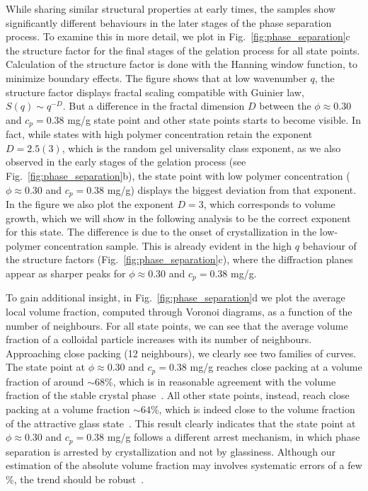 \documentclass[preprint,amsmath,amssymb,superscriptaddress]{revtex4}
\begin{document}
While sharing similar structural properties at early times, the samples show significantly different behaviours in the later stages of the phase separation process.
To examine this in more detail, we plot in Fig.~\ref{fig:phase_separation}c the structure factor for the final stages of the gelation process for all state points.
Calculation of the structure factor is done with the Hanning window function, to minimize boundary effects.
The figure shows that at low wavenumber $q$, the structure factor displays fractal scaling compatible with Guinier law, $S(q)\sim q^{-D}$.
But a difference in the fractal dimension $D$ between the $\phi\approx 0.30$ and $c_p=0.38$ mg/g state point and other state points starts to become visible. In fact, while states
with high polymer concentration retain the exponent $D=2.5(3)$, 
which is the random gel universality class exponent, as we also observed in the early stages of the gelation process (see Fig.~\ref{fig:phase_separation}b),
the state point with low polymer concentration ($\phi\approx 0.30$ and $c_p=0.38$ mg/g) displays the biggest deviation from that exponent. In the figure we also
plot the exponent $D=3$, which corresponds to volume growth, which we will show in the following analysis to be the correct exponent for this state. 
The difference is due to the onset of crystallization in the low-polymer concentration sample. This is already evident in the high $q$ behaviour of
the structure factors (Fig.~\ref{fig:phase_separation}c), where the diffraction planes appear as sharper peaks for $\phi\approx 0.30$ and $c_p=0.38$ mg/g.

To gain additional insight, in Fig.~\ref{fig:phase_separation}d we plot the average local volume fraction, computed
through Voronoi diagrams, as a function of the number of neighbours. For all state points, we can see that the average volume fraction of a colloidal
particle increases with its number of neighbours. Approaching close packing (12 neighbours), we clearly see two families of curves. The state point
at $\phi\approx 0.30$ and $c_p=0.38$ mg/g reaches close packing at a volume fraction of around $\sim 68\%$, which is in reasonable agreement with the
volume fraction of the stable crystal phase~\cite{ilett1995phase}. All other state points, instead, reach close packing at a volume fraction $\sim 64\%$, which is
indeed close to the volume fraction of the attractive glass state~\cite{pham2002multiple}. 
This result clearly indicates that the state point at $\phi\approx 0.30$ and $c_p=0.38$ mg/g follows a different arrest mechanism, in which phase separation
is arrested by crystallization and not by glassiness. Although our estimation of the absolute volume fraction may involves systematic errors of a few \%, the trend should be robust~\cite{Poon2012}.
\end{document}
